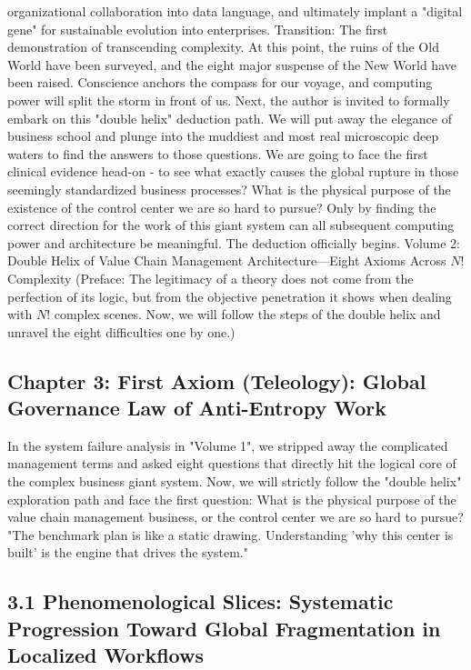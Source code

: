 \documentclass[11pt,a4paper]{article}
\begin{document}
organizational collaboration into data language, and ultimately implant a "digital gene" for sustainable evolution into enterprises. Transition: The first demonstration of transcending complexity. At this point, the ruins of the Old World have been surveyed, and the eight major suspense of the New World have been raised. Conscience anchors the compass for our voyage, and computing power will split the storm in front of us. Next, the author is invited to formally embark on this "double helix" deduction path. We will put away the elegance of business school and plunge into the muddiest and most real microscopic deep waters to find the answers to those questions. We are going to face the first clinical evidence head-on - to see what exactly causes the global rupture in those seemingly standardized business processes? What is the physical purpose of the existence of the control center we are so hard to pursue? Only by finding the correct direction for the work of this giant system can all subsequent computing power and architecture be meaningful. The deduction officially begins. Volume 2: Double Helix of Value Chain Management Architecture—Eight Axioms Across $N!$ Complexity (Preface: The legitimacy of a theory does not come from the perfection of its logic, but from the objective penetration it shows when dealing with $N!$ complex scenes. Now, we will follow the steps of the double helix and unravel the eight difficulties one by one.)

\subsection*{Chapter 3: First Axiom (Teleology): Global Governance Law of Anti-Entropy Work}
In the system failure analysis in "Volume 1", we stripped away the complicated management terms and asked eight questions that directly hit the logical core of the complex business giant system. Now, we will strictly follow the "double helix" exploration path and face the first question: What is the physical purpose of the value chain management business, or the control center we are so hard to pursue? "The benchmark plan is like a static drawing. Understanding 'why this center is built' is the engine that drives the system."


\subsection*{3.1 Phenomenological Slices: Systematic Progression Toward Global Fragmentation in Localized Workflows}
\end{document}
